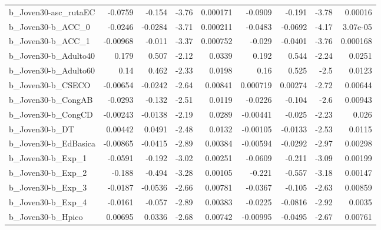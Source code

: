 \begin{tabular}{lrrrrrrrr}
b\_Joven30-asc\_rutaEC       &     -0.0759 &       -0.154 &     -3.76 & 0.000171 &    -0.0909 &      -0.191 &        -3.78 &       0.00016 \\
b\_Joven30-b\_ACC\_0          &     -0.0246 &      -0.0284 &     -3.71 & 0.000211 &    -0.0483 &     -0.0692 &        -4.17 &      3.07e-05 \\
b\_Joven30-b\_ACC\_1          &    -0.00968 &       -0.011 &     -3.37 & 0.000752 &     -0.029 &     -0.0401 &        -3.76 &      0.000168 \\
b\_Joven30-b\_Adulto40       &       0.179 &        0.507 &     -2.12 &   0.0339 &      0.192 &       0.544 &        -2.24 &        0.0251 \\
b\_Joven30-b\_Adulto60       &        0.14 &        0.462 &     -2.33 &   0.0198 &       0.16 &       0.525 &         -2.5 &        0.0123 \\
b\_Joven30-b\_CSECO          &    -0.00654 &      -0.0242 &     -2.64 &  0.00841 &   0.000719 &     0.00274 &        -2.72 &       0.00644 \\
b\_Joven30-b\_CongAB         &     -0.0293 &       -0.132 &     -2.51 &   0.0119 &    -0.0226 &      -0.104 &         -2.6 &       0.00943 \\
b\_Joven30-b\_CongCD         &    -0.00243 &      -0.0138 &     -2.19 &   0.0289 &   -0.00441 &      -0.025 &        -2.23 &         0.026 \\
b\_Joven30-b\_DT             &     0.00442 &       0.0491 &     -2.48 &   0.0132 &   -0.00105 &     -0.0133 &        -2.53 &        0.0115 \\
b\_Joven30-b\_EdBasica       &    -0.00865 &      -0.0415 &     -2.89 &  0.00384 &   -0.00594 &     -0.0292 &        -2.97 &       0.00298 \\
b\_Joven30-b\_Exp\_1          &     -0.0591 &       -0.192 &     -3.02 &  0.00251 &    -0.0609 &      -0.211 &        -3.09 &       0.00199 \\
b\_Joven30-b\_Exp\_2          &      -0.188 &       -0.494 &     -3.28 &  0.00105 &     -0.221 &      -0.557 &        -3.18 &       0.00147 \\
b\_Joven30-b\_Exp\_3          &     -0.0187 &      -0.0536 &     -2.66 &  0.00781 &    -0.0367 &      -0.105 &        -2.63 &       0.00859 \\
b\_Joven30-b\_Exp\_4          &     -0.0161 &       -0.057 &     -2.89 &  0.00383 &    -0.0225 &     -0.0816 &        -2.92 &        0.0035 \\
b\_Joven30-b\_Hpico          &     0.00695 &       0.0336 &     -2.68 &  0.00742 &   -0.00995 &     -0.0495 &        -2.67 &       0.00761 \\

\end{tabular}
